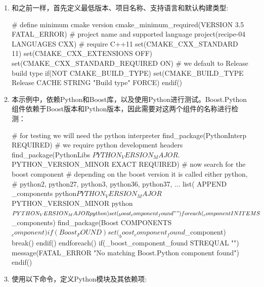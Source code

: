 \begin{enumerate}
\item 和之前一样，首先定义最低版本、项目名称、支持语言和默认构建类型:

\begin{codebox}[cmake]
# define minimum cmake version
cmake_minimum_required(VERSION 3.5 FATAL_ERROR)
# project name and supported language
project(recipe-04 LANGUAGES CXX)
# require C++11
set(CMAKE_CXX_STANDARD 11)
set(CMAKE_CXX_EXTENSIONS OFF)
set(CMAKE_CXX_STANDARD_REQUIRED ON)
# we default to Release build type
if(NOT CMAKE_BUILD_TYPE)
    set(CMAKE_BUILD_TYPE Release CACHE STRING "Build type" FORCE)
endif()
\end{codebox}

\item 本示例中，依赖Python和Boost库，以及使用Python进行测试。Boost.Python组件依赖于Boost版本和Python版本，因此需要对这两个组件的名称进行检测：

\begin{codebox}[cmake]
# for testing we will need the python interpreter
find_package(PythonInterp REQUIRED)
# we require python development headers
find_package(PythonLibs ${PYTHON_VERSION_MAJOR}.${PYTHON_VERSION_MINOR} EXACT REQUIRED)
# now search for the boost component
# depending on the boost version it is called either python,
# python2, python27, python3, python36, python37, ...
list(
  APPEND _components
    python${PYTHON_VERSION_MAJOR}${PYTHON_VERSION_MINOR}
    python${PYTHON_VERSION_MAJOR}
    python
  )
set(_boost_component_found "")
foreach(_component IN ITEMS ${_components})
  find_package(Boost COMPONENTS ${_component})
  if(Boost_FOUND)
    set(_boost_component_found ${_component})
    break()
  endif()
endforeach()
if(_boost_component_found STREQUAL "")
    message(FATAL_ERROR "No matching Boost.Python component found")
endif()
\end{codebox}

\item 使用以下命令，定义Python模块及其依赖项:



\end{enumerate}
